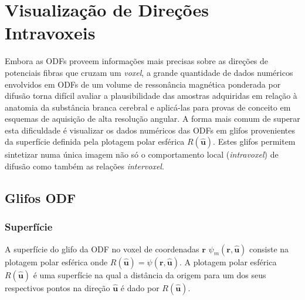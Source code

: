 \documentclass[
    12pt,                %
    oneside,            %
    a4paper,            %
    english,            %
    french,                %
    spanish,            %
    brazil                %
    ]{abntex2}
\begin{document}
\section{Visualização de Direções Intravoxeis}



Embora as ODFs proveem informações mais precisas sobre as direções de potenciais fibras que cruzam um \textit{voxel}, a grande quantidade de dados numéricos envolvidos em ODFs de um volume de ressonância magnética ponderada por difusão torna difícil avaliar a plausibilidade das amostras adquiridas em relação à anatomia da substância branca cerebral e aplicá-las para provas de conceito em esquemas de aquisição de alta resolução angular. A forma mais comum de superar esta dificuldade é visualizar os dados numéricos das ODFs em glifos provenientes da superfície definida pela plotagem polar esférica $R(\mathbf{\hat{u}})$. Estes glifos permitem sintetizar numa única imagem não só o comportamento local (\textit{intravoxel}) de difusão como também as relações \textit{intervoxel}.

\subsection{Glifos ODF}
\label{sec::glifos_odf}

\subsubsection{Superfície}

A superfície do glifo da ODF no voxel de coordenadas $\mathbf{r}$ $\psi_m(\mathbf{r}, \mathbf{\hat{u}})$ consiste na plotagem polar esférica onde $R(\mathbf{\hat{u}}) = \psi(\mathbf{r}, \mathbf{\hat{u}})$. A plotagem polar esférica $R(\mathbf{\hat{u}})$ é uma superfície na qual a distância da origem para um dos seus respectivos pontos na direção $\mathbf{\hat{u}}$ é dado por $R(\mathbf{\hat{u}})$.
\end{document}
